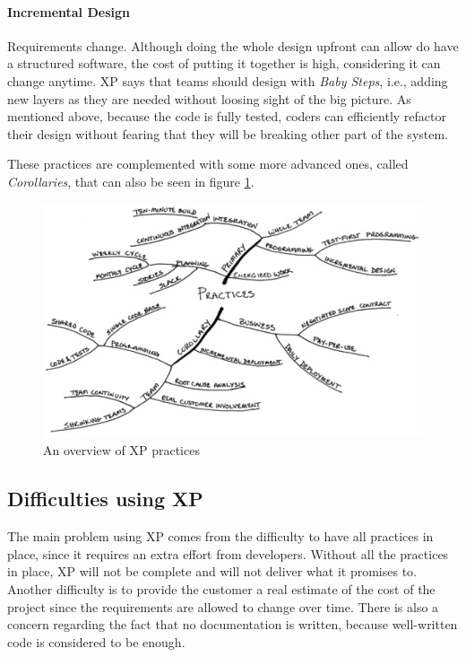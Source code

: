 \documentclass[conference]{IEEEtran}
\begin{document}
\paragraph{Incremental Design} Requirements change. Although doing the whole design upfront can allow do have a structured software, the cost of putting it together is high, considering it can change anytime. XP says that teams should design with \textit{Baby Steps}, i.e., adding new layers as they are needed without loosing sight of the big picture. As mentioned above, because the code is fully tested, coders can efficiently refactor their design without fearing that they will be breaking other part of the system.

These practices are complemented with some more advanced ones, called \textit{Corollaries}, that can also be seen in figure \ref{fig:xp_pract}.

\begin{figure}
\centering
\includegraphics[width=\linewidth]{xp_practices.png}
\caption{An overview of XP practices \cite{Beck:2004tc}}
\label{fig:xp_pract}
\end{figure}

\subsection{Difficulties using XP}
The main problem using XP comes from the difficulty to have all practices in place, since it requires an extra effort from developers. Without all the practices in place, XP will not be complete and will not deliver what it promises to.
Another difficulty is to provide the customer a real estimate of the cost of the project since the requirements are allowed to change over time. There is also a concern regarding the fact that no documentation is written, because well-written code is considered to be enough.\cite{Rosenberg:2003ui}
\end{document}
